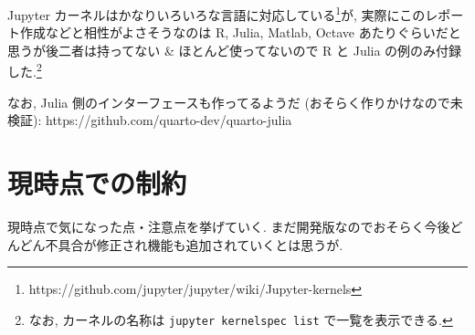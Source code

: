 \documentclass[
  letterpaper,
  DIV=11,
  pandoc,
  ja=standard,
  jafont=noto-otf]{bxjsarticle}
\begin{document}
Jupyter カーネルはかなりいろいろな言語に対応している\footnote{https://github.com/jupyter/jupyter/wiki/Jupyter-kernels}が,
実際にこのレポート作成などと相性がよさそうなのは R, Julia, Matlab,
Octave あたりぐらいだと思うが後二者は持ってない \&
ほとんど使ってないので R と Julia の例のみ付録した.\footnote{なお,
  カーネルの名称は \texttt{jupyter\ kernelspec\ list}
  で一覧を表示できる.}

なお, Julia 側のインターフェースも作ってるようだ
(おそらく作りかけなので未検証):
https://github.com/quarto-dev/quarto-julia

\hypertarget{ux73feux6642ux70b9ux3067ux306eux5236ux7d04}{%
\section{現時点での制約}\label{ux73feux6642ux70b9ux3067ux306eux5236ux7d04}}

現時点で気になった点・注意点を挙げていく.
まだ開発版なのでおそらく今後どんどん不具合が修正され機能も追加されていくとは思うが.
\end{document}
